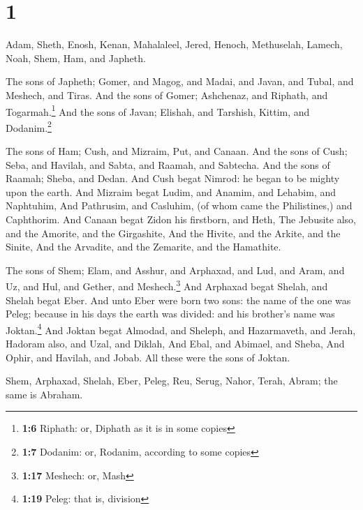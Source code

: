 \hypertarget{section}{%
\section{1}\label{section}}

 Adam, Sheth, Enosh,  Kenan, Mahalaleel,
Jered,  Henoch, Methuselah, Lamech,  Noah,
Shem, Ham, and Japheth.

 The sons of Japheth; Gomer, and Magog, and Madai, and
Javan, and Tubal, and Meshech, and Tiras.  And the sons of
Gomer; Ashchenaz, and Riphath, and Togarmah.\footnote{\textbf{1:6}
  Riphath: or, Diphath as it is in some copies}  And the
sons of Javan; Elishah, and Tarshish, Kittim, and Dodanim.\footnote{\textbf{1:7}
  Dodanim: or, Rodanim, according to some copies}

 The sons of Ham; Cush, and Mizraim, Put, and Canaan.
 And the sons of Cush; Seba, and Havilah, and Sabta, and
Raamah, and Sabtecha. And the sons of Raamah; Sheba, and Dedan.
 And Cush begat Nimrod: he began to be mighty upon the
earth.  And Mizraim begat Ludim, and Anamim, and Lehabim,
and Naphtuhim,  And Pathrusim, and Casluhim, (of whom
came the Philistines,) and Caphthorim.  And Canaan begat
Zidon his firstborn, and Heth,  The Jebusite also, and
the Amorite, and the Girgashite,  And the Hivite, and the
Arkite, and the Sinite,  And the Arvadite, and the
Zemarite, and the Hamathite.

 The sons of Shem; Elam, and Asshur, and Arphaxad, and
Lud, and Aram, and Uz, and Hul, and Gether, and Meshech.\footnote{\textbf{1:17}
  Meshech: or, Mash}  And Arphaxad begat Shelah, and
Shelah begat Eber.  And unto Eber were born two sons: the
name of the one was Peleg; because in his days the earth was divided:
and his brother's name was Joktan.\footnote{\textbf{1:19} Peleg: that
  is, division}  And Joktan begat Almodad, and Sheleph,
and Hazarmaveth, and Jerah,  Hadoram also, and Uzal, and
Diklah,  And Ebal, and Abimael, and Sheba,
 And Ophir, and Havilah, and Jobab. All these were the
sons of Joktan.

 Shem, Arphaxad, Shelah,  Eber, Peleg,
Reu,  Serug, Nahor, Terah,  Abram; the
same is Abraham.

